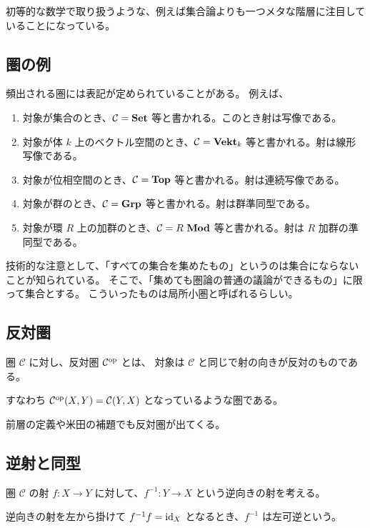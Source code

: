\documentclass[uplatex,a4j,12pt,dvipdfmx]{jsarticle}
\begin{document}
初等的な数学で取り扱うような、例えば集合論よりも一つメタな階層に注目していることになっている。

\subsection{圏の例}

頻出される圏には表記が定められていることがある。
例えば、

\begin{enumerate}
    \item 対象が集合のとき、${\mathcal C} = {\bf Set}$ 等と書かれる。このとき射は写像である。
    \item 対象が体 $k$ 上のベクトル空間のとき、${\mathcal C} = {\bf Vekt}_{k}$ 等と書かれる。射は線形写像である。
    \item 対象が位相空間のとき、${\mathcal C} = {\bf Top}$ 等と書かれる。射は連続写像である。
    \item 対象が群のとき、${\mathcal C} = {\bf Grp}$ 等と書かれる。射は群準同型である。
    \item 対象が環 $R$ 上の加群のとき、${\mathcal C} = R \ {\bf Mod}$ 等と書かれる。射は $R$ 加群の準同型である。
\end{enumerate}

技術的な注意として、「すべての集合を集めたもの」というのは集合にならないことが知られている。
そこで、「集めても圏論の普通の議論ができるもの」に限って集合とする。
こういったものは局所小圏と呼ばれるらしい。

\subsection{反対圏}

圏 ${\mathcal C}$ に対し、反対圏 ${\mathcal C}^{\rm op}$ とは、
対象は ${\mathcal C}$ と同じで射の向きが反対のものである。

すなわち ${\mathcal C}^{\rm op}(X,Y) = {\mathcal C}(Y,X)$ となっているような圏である。

前層の定義や米田の補題でも反対圏が出てくる。

\subsection{逆射と同型}

圏 ${\mathcal C}$ の射 $f: X \to Y$ に対して、$f^{-1}: Y \to X$ という逆向きの射を考える。

逆向きの射を左から掛けて $f^{-1} f = {\rm id}_{X}$ となるとき、$f^{-1}$ は左可逆という。
\end{document}
